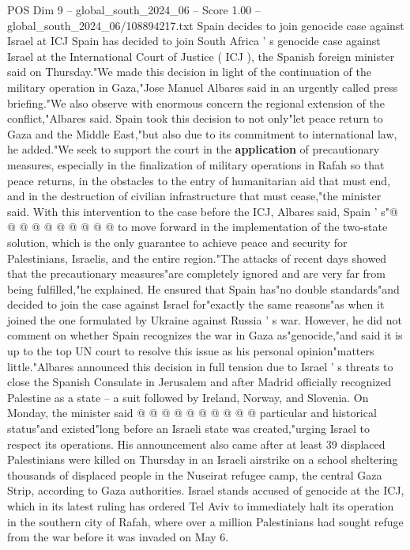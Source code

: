\begin{textsample}{POS Dim 9 – global\_south\_2024\_06 – Score 1.00 – global\_south\_2024\_06/108894217.txt}  \label{ex:f9_pos_092}
Spain decides to join genocide case against Israel at ICJ Spain has decided to join South Africa ' s genocide case against Israel at the International Court of Justice ( ICJ ), the Spanish foreign minister said on Thursday."We made this decision in light of the continuation of the military operation in Gaza,"Jose Manuel Albares said in an urgently called press briefing."We also observe with enormous concern the regional extension of the conflict,"Albares said.
Spain took this decision to not only"let peace return to Gaza and the Middle East,"but also due to its commitment to international law, he added."We seek to support the court in the \textbf{application} of precautionary measures, especially in the finalization of military operations in Rafah so that peace returns, in the obstacles to the entry of humanitarian aid that must end, and in the destruction of civilian infrastructure that must cease,"the minister said.
With this intervention to the case before the ICJ, Albares said, Spain ' s"@ @ @ @ @ @ @ @ @ @ to move forward in the implementation of the two-state solution, which is the only guarantee to achieve peace and security for Palestinians, Israelis, and the entire region."The attacks of recent days showed that the precautionary measures"are completely ignored and are very far from being fulfilled,"he explained.
He ensured that Spain has"no double standards"and decided to join the case against Israel for"exactly the same reasons"as when it joined the one formulated by Ukraine against Russia ' s war.
However, he did not comment on whether Spain recognizes the war in Gaza as"genocide,"and said it is up to the top UN court to resolve this issue as his personal opinion"matters little."Albares announced this decision in full tension due to Israel ' s threats to close the Spanish Consulate in Jerusalem and after Madrid officially recognized Palestine as a state -- a suit followed by Ireland, Norway, and Slovenia.
On Monday, the minister said @ @ @ @ @ @ @ @ @ @ particular and historical status"and existed"long before an Israeli state was created,"urging Israel to respect its operations.
His announcement also came after at least 39 displaced Palestinians were killed on Thursday in an Israeli airstrike on a school sheltering thousands of displaced people in the Nuseirat refugee camp, the central Gaza Strip, according to Gaza authorities.
Israel stands accused of genocide at the ICJ, which in its latest ruling has ordered Tel Aviv to immediately halt its operation in the southern city of Rafah, where over a million Palestinians had sought refuge from the war before it was invaded on May 6.

\end{textsample}
